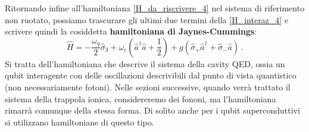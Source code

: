 \noindent Ritornando infine all'hamiltoniana \eqref{H_da_riscrivere_4} nel sistema di riferimento non ruotato, possiamo trascurare gli ultimi due termini della \eqref{H_interaz_4} e scrivere quindi la cosiddetta \textbf{hamiltoniana di Jaynes-Cummings}:
\begin{equation}\label{eq:ham-jaynes-cummings}
    \hat H = -\frac{\omega_q}{2}\hat \sigma_3 + \omega_c\left(\hat a^\dagger \hat a + \frac 12\right)+g\left(\hat \sigma_+\hat a^\dagger + \hat \sigma_-\hat a\right) \, .
\end{equation}
Si tratta dell'hamiltoniana che descrive il sistema della cavity QED, ossia un qubit interagente con delle oscillazioni descrivibili dal punto di vista quantistico (non necessariamente fotoni). Nelle sezioni successive, quando verrà trattato il sistema della trappola ionica, considereremo dei fononi, ma l'hamiltoniana rimarrà comunque della stessa forma. Di solito anche per i qubit superconduttivi si utilizzano hamiltoniane di questo tipo.